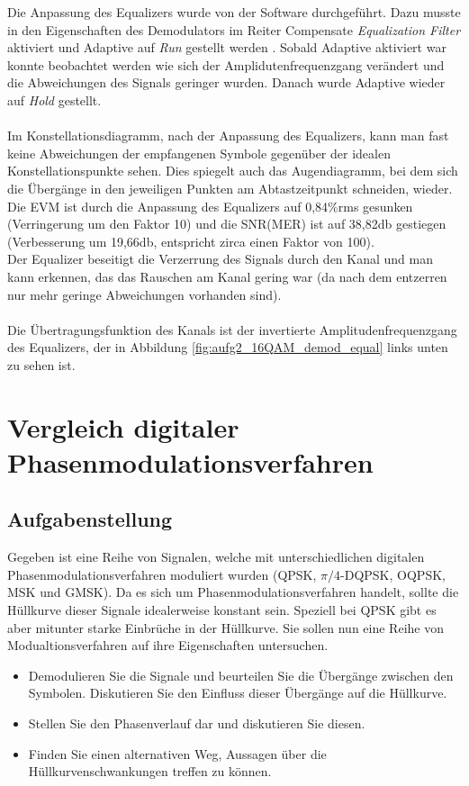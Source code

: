 \documentclass[12pt,a4paper,ngerman]{article}
\begin{document}
Die Anpassung des Equalizers wurde von der Software durchgeführt. Dazu musste in den Eigenschaften des Demodulators im Reiter Compensate \emph{Equalization Filter} aktiviert und Adaptive auf \emph{Run} gestellt werden \cite[23]{skript}.
Sobald Adaptive aktiviert war konnte beobachtet werden wie sich der Amplidutenfrequenzgang verändert und die Abweichungen des Signals geringer wurden. Danach wurde Adaptive wieder auf \emph{Hold} gestellt.\\
\\
Im Konstellationsdiagramm, nach der Anpassung des Equalizers, kann man fast keine Abweichungen der empfangenen Symbole gegenüber der idealen Konstellationspunkte sehen. Dies spiegelt auch das Augendiagramm, bei dem sich die Übergänge in den jeweiligen Punkten am Abtastzeitpunkt schneiden, wieder.\\
Die EVM ist durch die Anpassung des Equalizers auf 0,84\%rms gesunken (Verringerung um den Faktor 10) und die SNR(MER) ist auf 38,82db gestiegen (Verbesserung um 19,66db, entspricht zirca einen Faktor von 100).\\
Der Equalizer beseitigt die Verzerrung des Signals durch den Kanal und man kann erkennen, das das Rauschen am Kanal gering war (da nach dem entzerren nur mehr geringe Abweichungen vorhanden sind).\\
\\
Die Übertragungsfunktion des Kanals ist der invertierte Amplitudenfrequenzgang des Equalizers, der in Abbildung \ref{fig:aufg2_16QAM_demod_equal} links unten zu sehen ist.

\pagebreak



\section{Vergleich digitaler Phasenmodulationsverfahren}
\subsection{Aufgabenstellung}
Gegeben ist eine Reihe von Signalen, welche mit unterschiedlichen digitalen Phasenmodulationsverfahren moduliert wurden (QPSK, $\pi/4$-DQPSK, OQPSK, MSK und GMSK). Da es sich um Phasenmodulationsverfahren handelt, sollte die Hüllkurve dieser Signale idealerweise konstant sein. Speziell bei QPSK gibt es aber mitunter starke Einbrüche in der Hüllkurve. Sie sollen nun eine Reihe von Modualtionsverfahren auf ihre Eigenschaften untersuchen. 
\begin{itemize}
\item Demodulieren Sie die Signale und beurteilen Sie die Übergänge zwischen den Symbolen. Diskutieren Sie den Einfluss dieser Übergänge auf die Hüllkurve. 
\item Stellen Sie den Phasenverlauf dar und diskutieren Sie diesen.
\item Finden Sie einen alternativen Weg, Aussagen über die Hüllkurvenschwankungen treffen zu können.
\end{itemize}
\cite[19]{skript}
\end{document}
